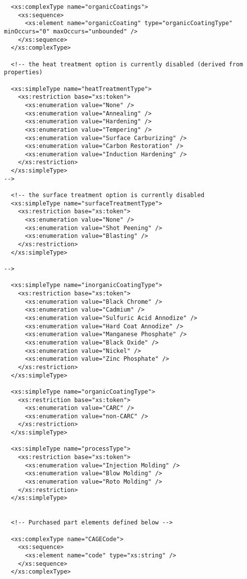 \begin{lstlisting}
  <xs:complexType name="organicCoatings">
    <xs:sequence>
      <xs:element name="organicCoating" type="organicCoatingType" minOccurs="0" maxOccurs="unbounded" />
    </xs:sequence>
  </xs:complexType>

  <!-- the heat treatment option is currently disabled (derived from properties)

  <xs:simpleType name="heatTreatmentType">
    <xs:restriction base="xs:token">
      <xs:enumeration value="None" />
      <xs:enumeration value="Annealing" />
      <xs:enumeration value="Hardening" />
      <xs:enumeration value="Tempering" />
      <xs:enumeration value="Surface Carburizing" />
      <xs:enumeration value="Carbon Restoration" />
      <xs:enumeration value="Induction Hardening" />
    </xs:restriction>
  </xs:simpleType>
-->

  <!-- the surface treatment option is currently disabled
  <xs:simpleType name="surfaceTreatmentType">
    <xs:restriction base="xs:token">
      <xs:enumeration value="None" />
      <xs:enumeration value="Shot Peening" />
      <xs:enumeration value="Blasting" />
    </xs:restriction>
  </xs:simpleType>

-->

  <xs:simpleType name="inorganicCoatingType">
    <xs:restriction base="xs:token">
      <xs:enumeration value="Black Chrome" />
      <xs:enumeration value="Cadmium" />
      <xs:enumeration value="Sulfuric Acid Annodize" />
      <xs:enumeration value="Hard Coat Annodize" />
      <xs:enumeration value="Manganese Phosphate" />
      <xs:enumeration value="Black Oxide" />
      <xs:enumeration value="Nickel" />
      <xs:enumeration value="Zinc Phosphate" />
    </xs:restriction>
  </xs:simpleType>

  <xs:simpleType name="organicCoatingType">
    <xs:restriction base="xs:token">
      <xs:enumeration value="CARC" />
      <xs:enumeration value="non-CARC" />
    </xs:restriction>
  </xs:simpleType>

  <xs:simpleType name="processType">
    <xs:restriction base="xs:token">
      <xs:enumeration value="Injection Molding" />
      <xs:enumeration value="Blow Molding" />
      <xs:enumeration value="Roto Molding" />
    </xs:restriction>
  </xs:simpleType>


  <!-- Purchased part elements defined below -->

  <xs:complexType name="CAGECode">
    <xs:sequence>
      <xs:element name="code" type="xs:string" />
    </xs:sequence>
  </xs:complexType>


\end{lstlisting}
